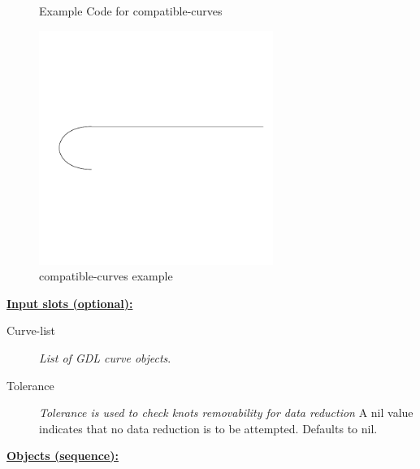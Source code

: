 \documentclass [11pt]{book}
\begin{document}
\begin{itemize}
\begin{figure}
\caption{Example Code for compatible-curves}

\label{fig:example-code-compatible-curves}

\end{figure}

\begin{figure}
\begin{center}
\includegraphics[width=3in,height=3in]{../images/example-compatible-curves.pdf}
\end{center}

\caption{compatible-curves example}

\label{fig:compatible-curves}

\end{figure}





\textbf{
\underline{Input slots (optional):}}

\begin{description}

\item [Curve-list]
\emph{List of GDL curve objects}.


\item [Tolerance]
\emph{Tolerance is used to check knots removability for data reduction} A nil value indicates that no data reduction
is to be attempted. Defaults to nil.


\end{description}






\textbf{
\underline{Objects (sequence):}}

\begin{description}


\end{description}
\end{itemize}
\end{document}
